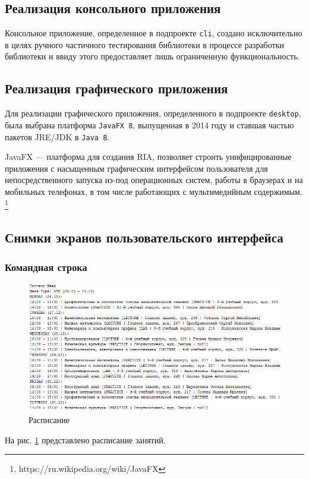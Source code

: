 \subsection{Реализация консольного приложения}

Консольное приложение, определенное в подпроекте \texttt{cli}, создано исключительно в целях ручного частичного тестирования библиотеки в процессе разработки библиотеки и ввиду этого предоставляет лишь ограниченную функциональность.

\subsection{Реализация графического приложения} 

Для реализации графического приложения, определенного в подпроекте \texttt{desktop}, была выбрана платформа \texttt{JavaFX 8}, выпущенная в 2014 году и ставшая частью пакетов JRE/JDK в \texttt{Java 8}.

JavaFX — платформа для создания RIA, позволяет строить унифицированные приложения с насыщенным графическим интерфейсом пользователя для непосредственного запуска из-под операционных систем, работы в браузерах и на мобильных телефонах, в том числе работающих с мультимедийным содержимым. \footnote{https://ru.wikipedia.org/wiki/JavaFX}

\subsection{Снимки экранов пользовательского интерфейса}
\subsubsection{Командная строка}

\begin{figure}[H]
	\begin{center}
		\includegraphics[scale=0.8]{pics/1}
		\caption{Расписание} 
		\label{pic:1} %
	\end{center}
\end{figure}
На рис. \ref{pic:1} представлено расписание занятий.

